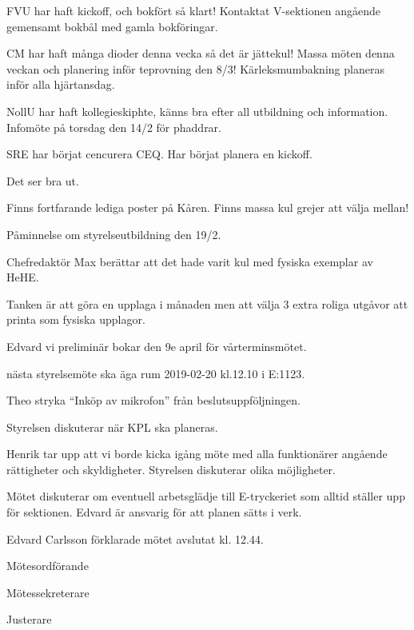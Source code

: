\documentclass[10pt]{article}
\def\mo{Edvard Carlsson}
\def\ms{Sonja Kenari}
\def\ji{Stephanie Bol}
\begin{document}
\begin{paragrafer}
\begin{paragrafer}
FVU har haft kickoff, och bokfört så klart! Kontaktat V-sektionen angående gemensamt bokbål med gamla bokföringar.

CM har haft många dioder denna vecka så det är jättekul! Massa möten denna veckan och planering inför teprovning den 8/3! Kärleksmumbakning planeras inför alla hjärtansdag.

NollU har haft kollegieskiphte, känns bra efter all utbildning och information. Infomöte på torsdag den 14/2 för phaddrar. 

SRE har börjat cencurera CEQ. Har börjat planera en kickoff.



Det ser bra ut.

Finns fortfarande lediga poster på Kåren. Finns massa kul grejer att välja mellan!

Påminnelse om styrelseutbildning den 19/2.
\end{paragrafer}

Chefredaktör Max berättar att det hade varit kul med fysiska exemplar av HeHE. 

Tanken är att göra en upplaga i månaden men att välja 3 extra roliga utgåvor att printa som fysiska upplagor.

\Mbaby


Edvard \ypa vi preliminär bokar den 9e april för vårterminsmötet.

\Mbaby

\Mba nästa styrelsemöte ska äga rum 2019-02-20 kl.12.10 i E:1123.

Theo \ypa stryka ``Inköp av mikrofon'' från beslutsuppföljningen.

\Mbaby

Styrelsen diskuterar när KPL ska planeras.

Henrik tar upp att vi borde kicka igång möte med alla funktionärer angående rättigheter och skyldigheter. Styrelsen diskuterar olika möjligheter.

Mötet diskuterar om eventuell arbetsglädje till E-tryckeriet som alltid ställer upp för sektionen. Edvard är ansvarig för att planen sätts i verk.

{\mo} förklarade mötet avslutat kl. 12.44. 
\end{paragrafer}

\hidesignfoot
\begin{signatures}{3}
\signature{\mo}{Mötesordförande}
\signature{\ms}{Mötessekreterare}
\signature{\ji}{Justerare}
\end{signatures}
\end{document}
